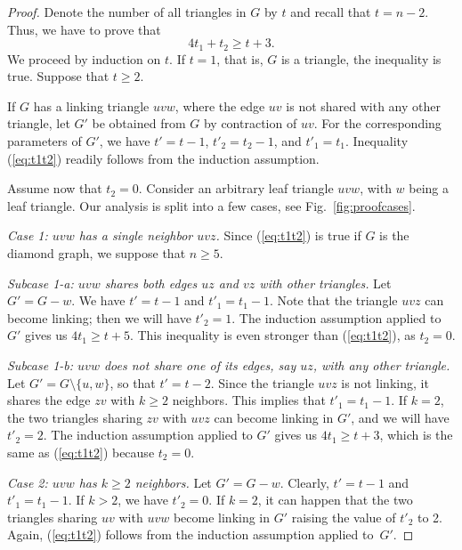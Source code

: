 \documentclass[reqno,12pt]{amsart}
\newcommand{\refeq}[1]{(\ref{eq:#1})}
\newcommand{\Case}[2]{\smallskip\par{\it Case #1:\/ #2}}
\newcommand{\Subcase}[2]{\smallskip\par{\it Subcase #1:\/ #2}}
\begin{document}
\begin{proof}
Denote the number of all triangles in $G$ by $t$ and recall that $t=n-2$.
Thus, we have to prove that
\begin{equation}\label{eq:t1t2}
4t_1+t_2\ge t+3.
\end{equation}
We proceed by induction on $t$. If $t=1$, that is, $G$ is a triangle, 
the inequality is true. Suppose that $t\ge2$.

If $G$ has a linking triangle $uvw$, where the edge $uv$ is not shared with
any other triangle, let $G'$ be obtained from $G$ by contraction of $uv$.
For the corresponding parameters of $G'$, we have $t'=t-1$, $t'_2=t_2-1$,
and $t'_1=t_1$. Inequality \refeq{t1t2} readily follows from the induction assumption.

Assume now that $t_2=0$. Consider an arbitrary leaf triangle $uvw$, with $w$ being a leaf
triangle. Our analysis is split into a few cases, see Fig.~\ref{fig:proofcases}.


\Case 1{$uvw$ has a single neighbor $uvz$.}
Since \refeq{t1t2} is true if $G$ is the diamond graph, we suppose that $n\ge5$.

\Subcase{1-a}{$uvw$ shares both edges $uz$ and $vz$ with other triangles.}
Let $G'=G-w$. We have $t'=t-1$ and $t'_1=t_1-1$. Note that the triangle $uvz$
can become linking; then we will have $t'_2=1$. The induction assumption applied to $G'$
gives us $4t_1\ge t+5$. This inequality is even stronger than \refeq{t1t2}, as $t_2=0$.

\Subcase{1-b}{$uvw$ does not share one of its edges, say $uz$, with any other triangle.}
Let $G'=G\setminus\{u,w\}$, so that $t'=t-2$. Since the triangle $uvz$ is not linking, it shares the edge
$zv$ with $k\ge2$ neighbors. This implies that $t'_1=t_1-1$. If $k=2$, the two triangles sharing $zv$ with $uvz$
can become linking in $G'$, and we will have $t'_2=2$. The induction assumption applied to $G'$
gives us $4t_1\ge t+3$, which is the same as \refeq{t1t2} because $t_2=0$.

\Case 2{$uvw$ has $k\ge2$ neighbors.} 
Let $G'=G-w$. Clearly, $t'=t-1$ and $t'_1=t_1-1$.
If $k>2$, we have $t'_2=0$. If $k=2$, it can happen that the two triangles
sharing $uv$ with $uvw$ become linking in $G'$ raising the value of $t'_2$ to 2.
Again, \refeq{t1t2} follows from the induction assumption applied to~$G'$.
\end{proof}
\end{document}
